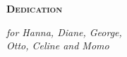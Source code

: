 \newpage 
{}
{}
\begin{flushleft}
	\Huge \textsc{\textbf{Dedication}}

\end{flushleft}
\vspace*{8cm}
\begin{flushright}
   \emph{for Hanna, Diane, George,}\\
   \emph{Otto, Celine and Momo}
\end{flushright}
 
